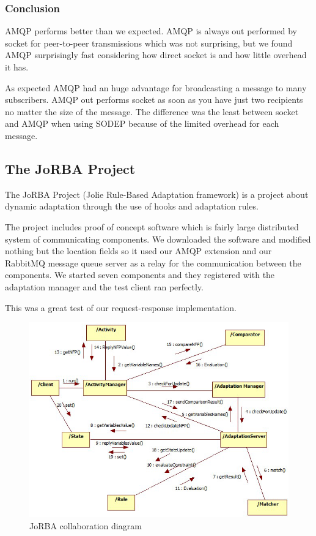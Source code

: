 \subsubsection{Conclusion}
AMQP performs better than we expected. AMQP is always out performed by socket for peer-to-peer transmissions which was not surprising, but we found AMQP surprisingly fast considering how direct socket is and how little overhead it has.

As expected AMQP had an huge advantage for broadcasting a message to many subscribers. AMQP out performs socket as soon as you have just two recipients no matter the size of the message. The difference was the least between socket and AMQP when using SODEP because of the limited overhead for each message.
\subsection{The JoRBA Project}
\label{subsec:The JoRBA Project}
The JoRBA Project\cite{Jorba} (Jolie Rule-Based Adaptation framework) is a project about dynamic adaptation through the use of hooks and adaptation rules.

The project includes proof of concept software which is fairly large distributed system of communicating components. We downloaded the software and modified nothing but the location fields so it used our AMQP extension and our RabbitMQ message queue server as a relay for the communication between the components. We started seven components and they registered with the adaptation manager and the test client ran perfectly.

This was a great test of our request-response implementation.
\begin{figure}[H]
  \includegraphics[width=\textwidth]{illustrations/Jorba.png}
  \caption{JoRBA collaboration diagram}
\end{figure}
\newpage
